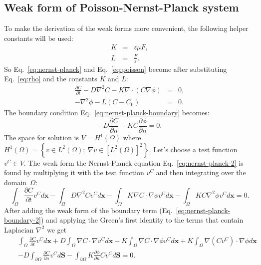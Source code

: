 \subsection{Weak form of Poisson-Nernst-Planck system}

To make the derivation of the weak forms more convenient, the following
helper constants will be used: 
\begin{eqnarray}
  K & = &z \mu F,\\
  L&=&\frac{F}{\varepsilon}.
  \label{eq:KL}
\end{eqnarray}
So Eq.~\eqref{eq:nernst-planck} and Eq.~\eqref{eq:poisson} become after 
substituting Eq.~\eqref{eq:rho} and the constants $K$ and $L$:
\begin{eqnarray}
  \frac{\partial C}{\partial t}-D\nabla^2 C-K\nabla\cdot \left(C\nabla\phi\right)&=&0,\label{eq:nernst-planck-2}\\
  -\nabla^2\phi-L\left(C-C_{0}\right)&=&0.\label{eq:poisson-2}
\end{eqnarray}
The boundary condition Eq.~\eqref{eq:nernst-planck-boundary} becomes:
\begin{equation}
  -D\frac{\partial C}{\partial n}-KC\frac{\partial\phi}{\partial n}=0.
  \label{eq:nernst-planck-boundary-2}
\end{equation}
The space for solution is $V=H^1\left(\Omega\right)$ where 
$H^1\left(\Omega\right)=\left\{v\in L^2\left(\Omega\right);\ \nabla v \in \left[L^2\left(\Omega\right)\right]^2\right\}$.
Let's choose a test function $v^C\in V$.
The weak form the Nernst-Planck equation Eq.~\eqref{eq:nernst-planck-2}
is found by multiplying it with the test function $v^C$ and then integrating over the domain~$\Omega$:
\begin{equation}
  \int_{\Omega}\frac{\partial C}{\partial t}v^C d\mathbf{x}
  -\int_{\Omega}D\nabla^2Cv^C d\mathbf{x}-\int_{\Omega}K\nabla C\cdot
  \nabla\phi v^C d\mathbf{x} - \int_{\Omega}KC\nabla^2\phi v^C d\mathbf{x}=0.
  \label{eq:nernst-planck-weak1}
\end{equation}
After adding the weak form of the boundary term 
(Eq.~\eqref{eq:nernst-planck-boundary-2}) and applying
the Green's first identity to the terms that contain Laplacian $\nabla^2$ we get
\begin{eqnarray}
 && \int_{\Omega}\frac{\partial C}{\partial t}v^C d\mathbf{x}+
  D\int_{\Omega}\nabla C\cdot\nabla v^C d\mathbf{x}-
  K\int_{\Omega}\nabla C \cdot \nabla \phi v^C d\mathbf{x}+
  K\int_{\Omega}\nabla\left(Cv^C\right)\cdot \nabla \phi d\mathbf{x}\\
  &&-D\int_{\partial\Omega}\frac{\partial C}{\partial n}v^C d\mathbf{S}-
  \int_{\partial\Omega}K\frac{\partial\phi}{\partial n}Cv^C d\mathbf{S}=0.
  \label{eq:nernst-planck-weak2}
\end{eqnarray}
